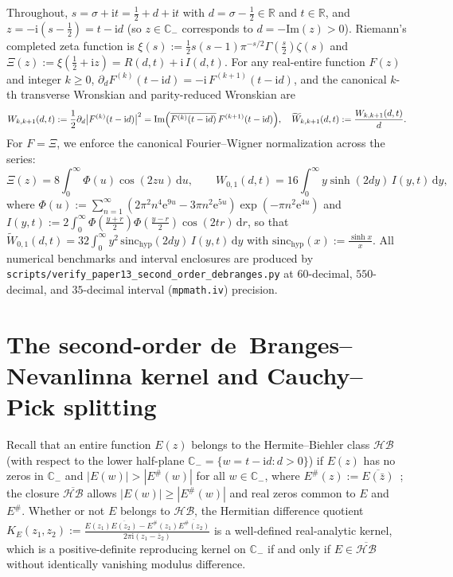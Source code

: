 \documentclass[11pt,reqno]{amsart}
\theoremstyle{definition}
\theoremstyle{remark}
\numberwithin{equation}{section}
\newcommand{\R}{\mathbb{R}}
\newcommand{\C}{\mathbb{C}}
\newcommand{\dd}{\mathrm{d}}
\newcommand{\ee}{\mathrm{e}}
\newcommand{\ii}{\mathrm{i}}
\newcommand{\Ima}{\mathrm{Im}}
\newcommand{\sinch}{\mathrm{sinc}_{\mathrm{hyp}}}
\begin{document}
Throughout, $s = \sigma + \ii t = \frac{1}{2} + d + \ii t$ with $d = \sigma - \frac{1}{2} \in \R$ and $t \in \R$, and $z = -\ii(s - \frac{1}{2}) = t - \ii d$ (so $z \in \C_-$ corresponds to $d = -\Ima(z) > 0$). Riemann's completed zeta function is $\xi(s) := \frac{1}{2}s(s-1)\pi^{-s/2}\Gamma(\frac{s}{2})\zeta(s)$ and $\Xi(z) := \xi(\frac{1}{2}+\ii z) = R(d,t) + \ii\,I(d,t)$. For any real-entire function $F(z)$ and integer $k \ge 0$, $\partial_d F^{(k)}(t - \ii d) = -\ii\,F^{(k+1)}(t - \ii d)$, and the canonical $k$-th transverse Wronskian and parity-reduced Wronskian are
\begin{equation}\label{eq:W_k_def}
W_{k,k+1}(d,t) := \frac{1}{2}\partial_d\bigl|F^{(k)}(t - \ii d)\bigr|^2 = \Ima\Bigl(\overline{F^{(k)}(t - \ii d)}\,F^{(k+1)}(t - \ii d)\Bigr), \quad \widetilde{W}_{k,k+1}(d,t) := \frac{W_{k,k+1}(d,t)}{d}.
\end{equation}
For $F = \Xi$, we enforce the canonical Fourier--Wigner normalization across the series:
\begin{equation}\label{eq:canonical_wigner_norm}
\Xi(z) = 8\int_0^\infty \Phi(u)\cos(2zu)\,\dd u, \qquad W_{0,1}(d,t) = 16\int_0^\infty y\sinh(2dy)\,I(y,t)\,\dd y,
\end{equation}
where $\Phi(u) := \sum_{n=1}^\infty (2\pi^2 n^4 \ee^{9u} - 3\pi n^2 \ee^{5u})\exp(-\pi n^2 \ee^{4u})$ and $I(y,t) := 2\int_0^\infty \Phi(\frac{y+r}{2})\Phi(\frac{y-r}{2})\cos(2tr)\,\dd r$, so that $\widetilde{W}_{0,1}(d,t) = 32\int_0^\infty y^2\,\sinch(2dy)\,I(y,t)\,\dd y$ with $\sinch(x) := \frac{\sinh x}{x}$. All numerical benchmarks and interval enclosures are produced by \texttt{scripts/}\allowbreak\texttt{verify\_paper13\_}\allowbreak\texttt{second\_order\_}\allowbreak\texttt{debranges.py} at $60$-decimal, $550$-decimal, and $35$-decimal interval (\texttt{mpmath.iv}) precision.

\section{The second-order de~Branges--Nevanlinna kernel and Cauchy--Pick splitting}\label{sec:kernel_split}

Recall that an entire function $E(z)$ belongs to the Hermite--Biehler class $\mathcal{HB}$ (with respect to the lower half-plane $\C_- = \{w = t - \ii d : d > 0\}$) if $E(z)$ has no zeros in $\C_-$ and $|E(w)| > |E^\#(w)|$ for all $w \in \C_-$, where $E^\#(z) := \overline{E(\bar{z})}$~\cite{debranges1968}; the closure $\overline{\mathcal{HB}}$ allows $|E(w)| \ge |E^\#(w)|$ and real zeros common to $E$ and $E^\#$. Whether or not $E$ belongs to $\mathcal{HB}$, the Hermitian difference quotient $K_E(z_1, z_2) := \frac{E(z_1)\overline{E(z_2)} - E^\#(z_1)\overline{E^\#(z_2)}}{2\pi\ii(z_1 - \bar{z}_2)}$ is a well-defined real-analytic kernel, which is a positive-definite reproducing kernel on $\C_-$ if and only if $E \in \overline{\mathcal{HB}}$ without identically vanishing modulus difference.
\end{document}
